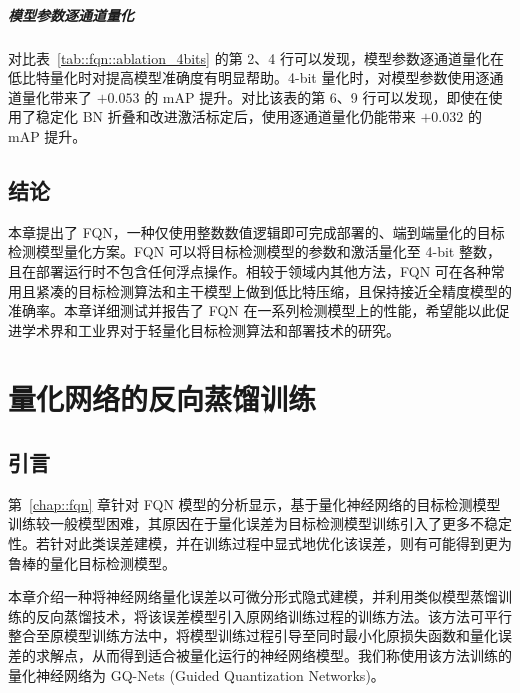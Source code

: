 \documentclass[
  fontset = mac,
]{shtthesis}
\begin{document}
\paragraph{模型参数逐通道量化}
对比表~\ref{tab::fqn::ablation_4bits} 的第 2、4 行可以发现，模型参数逐通道量化在低比特量化时对提高模型准确度有明显帮助。4-bit 量化时，对模型参数使用逐通道量化带来了 $+0.053$ 的 mAP 提升。对比该表的第 6、9 行可以发现，即使在使用了稳定化 BN 折叠和改进激活标定后，使用逐通道量化仍能带来 $+0.032$ 的 mAP 提升。
\section{结论}
本章提出了 FQN，一种仅使用整数数值逻辑即可完成部署的、端到端量化的目标检测模型量化方案。FQN 可以将目标检测模型的参数和激活量化至 4-bit 整数，且在部署运行时不包含任何浮点操作。相较于领域内其他方法，FQN 可在各种常用且紧凑的目标检测算法和主干模型上做到低比特压缩，且保持接近全精度模型的准确率。本章详细测试并报告了 FQN 在一系列检测模型上的性能，希望能以此促进学术界和工业界对于轻量化目标检测算法和部署技术的研究。
\chapter{量化网络的反向蒸馏训练} \label{chap::gq_nets}
\section{引言}
第~\ref{chap::fqn} 章针对 FQN 模型的分析显示，基于量化神经网络的目标检测模型训练较一般模型困难，其原因在于量化误差为目标检测模型训练引入了更多不稳定性。若针对此类误差建模，并在训练过程中显式地优化该误差，则有可能得到更为鲁棒的量化目标检测模型。

本章介绍一种将神经网络量化误差以可微分形式隐式建模，并利用类似模型蒸馏训练的反向蒸馏技术，将该误差模型引入原网络训练过程的训练方法。该方法可平行整合至原模型训练方法中，将模型训练过程引导至同时最小化原损失函数和量化误差的求解点，从而得到适合被量化运行的神经网络模型。我们称使用该方法训练的量化神经网络为 GQ-Nets (Guided Quantization Networks)。
\end{document}
